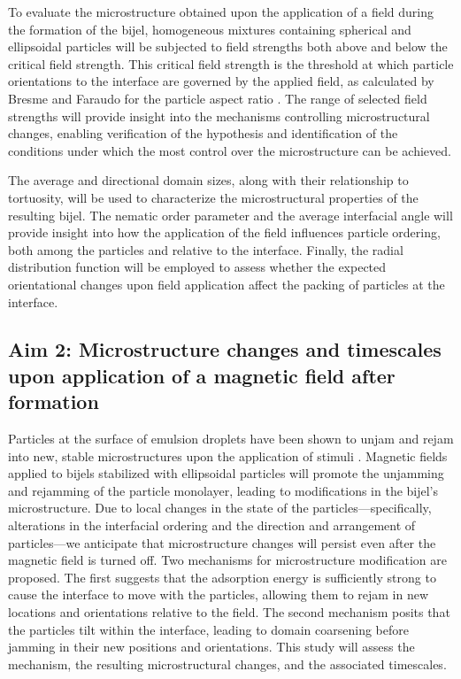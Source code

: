 To evaluate the microstructure obtained upon the application of a field during the formation of the bijel, homogeneous mixtures containing spherical and 
ellipsoidal particles will be subjected to field strengths both above and below the critical field strength. This critical field strength is the threshold 
at which particle orientations to the interface are governed by the applied field, as calculated by Bresme and Faraudo for the particle aspect ratio 
\cite{bresme_orientational_2007, davies_interface_2014}. The range of selected field strengths will provide insight into the mechanisms controlling 
microstructural changes, enabling verification of the hypothesis and identification of the conditions under which the most control over the microstructure 
can be achieved.

The average and directional domain sizes, along with their relationship to tortuosity, will be used to characterize the microstructural properties of the 
resulting bijel. The nematic order parameter and the average interfacial angle will provide insight into how the application of the field influences particle 
ordering, both among the particles and relative to the interface. Finally, the radial distribution function will be employed to assess whether the expected 
orientational changes upon field application affect the packing of particles at the interface.

\subsection{Aim 2: Microstructure changes and timescales upon application of a magnetic field after formation}
\label{section:aim2_desc}

Particles at the surface of emulsion droplets have been shown to unjam and rejam into new, stable microstructures upon the application of stimuli 
\cite{cui_stabilizing_2013}. Magnetic fields applied to bijels stabilized with ellipsoidal particles will promote the unjamming and rejamming of the 
particle monolayer, leading to modifications in the bijel's microstructure. Due to local changes in the state of the particles—specifically, alterations 
in the interfacial ordering and the direction and arrangement of particles—we anticipate that microstructure changes will persist even after the magnetic 
field is turned off. Two mechanisms for microstructure modification are proposed. The first suggests that the adsorption energy is sufficiently strong to 
cause the interface to move with the particles, allowing them to rejam in new locations and orientations relative to the field. The second mechanism posits 
that the particles tilt within the interface, leading to domain coarsening before jamming in their new positions and orientations. This study will assess the 
mechanism, the resulting microstructural changes, and the associated timescales.

